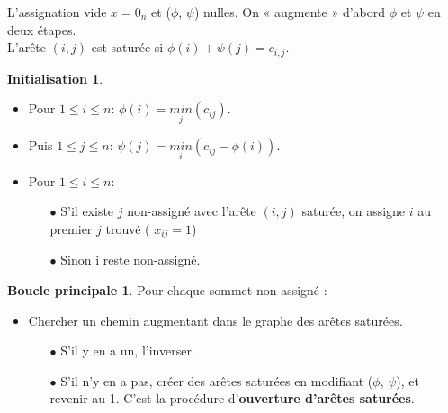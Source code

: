 \documentclass{beamer}
\theoremstyle{definition}
\newtheorem{intro}{Initialisation}
\newtheorem{boucle}{Boucle principale}
\begin{document}
\begin{frame}
	L'assignation vide $x = 0_n$ et ($\phi$, $\psi$) nulles. On « augmente » d'abord $\phi$ et $\psi$ en deux étapes. \\
	L'arête $(i,j)$ est saturée si $\phi(i)+\psi(j)=c_{i,j}$.
			\begin{minipage}[t]{1\linewidth}
		\begin{minipage}{0.48\linewidth}
			\begin{intro}
				\begin{itemize}
					\item Pour $1\leq i\leq n$: $\phi(i) = \underset{j}{min}(c_{ij})$.
					\item Puis $1\leq j\leq n$: $\psi(j) = \underset{i}{min}(c_{ij} - \phi(i))$.
					\item Pour $1\leq i\leq n$:
					\begin{itemize}
						\item[$\bullet$] S'il existe $j$ non-assigné avec l'arête $(i, j)$ saturée, on assigne $i$ au premier $j$ trouvé ( $x_{ij}=1$) 
						\item[$\bullet$] Sinon i reste non-assigné.
					\end{itemize}
										
					  
				\end{itemize}
			\end{intro}
		\end{minipage}\hfill
		\begin{minipage}{0.47\linewidth}
				\begin{boucle}
					Pour chaque sommet non assigné :
				\begin{itemize}
					\item Chercher un chemin augmentant dans le graphe des arêtes saturées. 
					\begin{itemize}
						\item[$\bullet$] S'il y en a un, l'inverser.
						\item[$\bullet$] S'il n'y en a pas, créer des arêtes saturées en modifiant ($\phi$, $\psi$), et revenir au 1. C'est la procédure d'\textbf{ouverture d'arêtes saturées}.
					\end{itemize}  
				\end{itemize}
			\end{boucle}
		\end{minipage}
	\end{minipage}	 
\end{frame}

\end{document}

